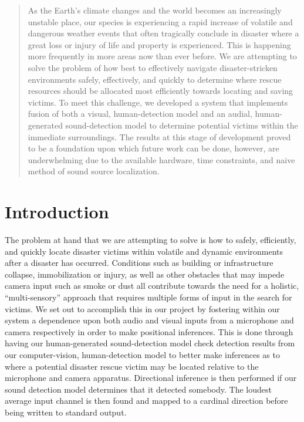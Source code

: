 \documentclass{article}
\author{
  Duggan, WIll\\
  \texttt{dwduggan@mail.sc.edu}
  \and
  Lewis, Cole\\
  \texttt{lewiscg@mail.sc.edu}
  \and
  Mallari, Daniella\\
  \texttt{dmallari@mail.sc.edu}
}
\title{}
\begin{document}

\begin{abstract}
As the Earth’s climate changes and the world becomes an increasingly unstable place, our species is experiencing a rapid increase of volatile and dangerous weather events that often tragically conclude in disaster where a great loss or injury of life and property is experienced. This is happening more frequently in more areas now than ever before. We are attempting to solve the problem of how best to effectively navigate disaster-stricken environments safely, effectively, and quickly to determine where rescue resources should be allocated most efficiently towards locating and saving victims. To meet this challenge, we developed a system that implements fusion of both a visual, human-detection model and an audial, human-generated sound-detection model to determine potential victims within the immediate surroundings. The results at this stage of development proved to be a foundation upon which future work can be done, however, are underwhelming due to the available hardware, time constraints, and naive method of sound source localization.

\end{abstract}

\section{Introduction}
The problem at hand that we are attempting to solve is how to safely, efficiently, and quickly locate disaster victims within volatile and dynamic environments after a disaster has occurred. Conditions such as building or infrastructure collapse, immobilization or injury, as well as other obstacles that may impede camera input such as smoke or dust all contribute towards the need for a holistic, “multi-sensory” approach that requires multiple forms of input in the search for victims. We set out to accomplish this in our project by fostering within our system a dependence upon both audio and visual inputs from a microphone and camera respectively in order to make positional inferences. This is done through having our human-generated sound-detection model check detection results from our computer-vision, human-detection model to better make inferences as to where a potential disaster rescue victim may be located relative to the microphone and camera apparatus. Directional inference is then performed if our sound detection model determines that it detected somebody. The loudest average input channel is then found and mapped to a cardinal direction before being written to standard output. 
\end{document}
